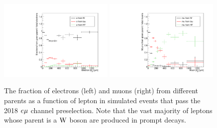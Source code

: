 \begin{figure}
\centering
\includegraphics[width=0.49\textwidth]{figures/bg/emu_tt_electronAbsD0_1000um_variableBins_coarse_ratios.pdf}
\includegraphics[width=0.49\textwidth]{figures/bg/emu_tt_muonAbsD0_1000um_variableBins_coarse_ratios.pdf}
\caption{The fraction of electrons (left) and muons (right) from different parents as a function of lepton \ad in simulated \ttbar events that pass the 2018 $e{\mu}$ channel preselection. Note that the vast majority of leptons whose parent is a $\mathrm{W}$ boson are produced in prompt decays.}
\label{ttbar_d0_behavior}
\end{figure}